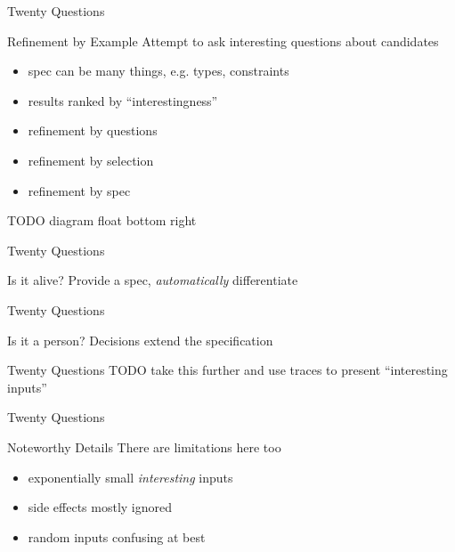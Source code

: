 \begin{frame}{Twenty Questions}
  \begin{block}{Refinement by Example}
    Attempt to ask interesting questions about candidates

    \begin{itemize}
      \item spec can be many things, e.g. types, constraints
      \item results ranked by ``interestingness''
      \item refinement by questions
      \item refinement by selection
      \item refinement by spec
    \end{itemize}

    TODO diagram float bottom right
  \end{block}
\end{frame}


\begin{frame}{Twenty Questions}
  \begin{block}{Is it alive?}
    Provide a spec, \textit{automatically} differentiate

    \begin{example}
      
    \end{example}
  \end{block}
\end{frame}

\begin{frame}{Twenty Questions}
  \begin{block}{Is it a person?}
    Decisions extend the specification

    \begin{example}
      
    \end{example}
  \end{block}
\end{frame}

\begin{frame}{Twenty Questions}
  TODO take this further and use traces to present ``interesting inputs''
\end{frame}


\begin{frame}{Twenty Questions}
  \begin{block}{Noteworthy Details}
    There are limitations here too

    \begin{itemize}
      \item exponentially small \textit{interesting} inputs
      \item side effects mostly ignored
      \item random inputs confusing at best
    \end{itemize}
  \end{block}
\end{frame}

